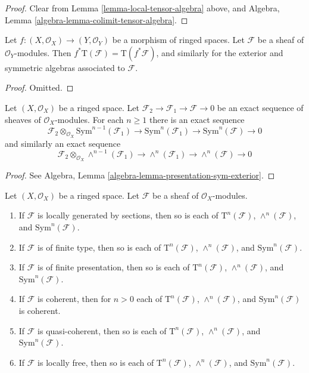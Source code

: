 \begin{proof}
Clear from Lemma \ref{lemma-local-tensor-algebra} above, and
Algebra, Lemma \ref{algebra-lemma-colimit-tensor-algebra}.
\end{proof}

\begin{lemma}
\label{lemma-pullback-tensor-algebra}
Let $f : (X, \mathcal{O}_X) \to (Y, \mathcal{O}_Y)$ be a morphism of
ringed spaces. Let $\mathcal{F}$ be a sheaf of $\mathcal{O}_Y$-modules.
Then $f^*\text{T}(\mathcal{F}) = \text{T}(f^*\mathcal{F})$,
and similarly for the exterior and symmetric algebras associated
to $\mathcal{F}$.
\end{lemma}

\begin{proof}
Omitted.
\end{proof}

\begin{lemma}
\label{lemma-presentation-sym-exterior}
Let $(X, \mathcal{O}_X)$ be a ringed space.
Let $\mathcal{F}_2 \to \mathcal{F}_1 \to \mathcal{F} \to 0$
be an exact sequence of sheaves of $\mathcal{O}_X$-modules.
For each $n \geq 1$ there is an exact sequence
$$
\mathcal{F}_2 \otimes_{\mathcal{O}_X} \text{Sym}^{n - 1}(\mathcal{F}_1)
\to
\text{Sym}^n(\mathcal{F}_1)
\to
\text{Sym}^n(\mathcal{F})
\to
0
$$
and similarly an exact sequence
$$
\mathcal{F}_2 \otimes_{\mathcal{O}_X} \wedge^{n - 1}(\mathcal{F}_1)
\to
\wedge^n(\mathcal{F}_1)
\to
\wedge^n(\mathcal{F})
\to
0
$$
\end{lemma}

\begin{proof}
See Algebra, Lemma \ref{algebra-lemma-presentation-sym-exterior}.
\end{proof}

\begin{lemma}
\label{lemma-tensor-algebra-permanence}
Let $(X, \mathcal{O}_X)$ be a ringed space.
Let $\mathcal{F}$ be a sheaf of $\mathcal{O}_X$-modules.
\begin{enumerate}
\item If $\mathcal{F}$ is locally generated by sections,
then so is each of $\text{T}^n(\mathcal{F})$,
$\wedge^n(\mathcal{F})$, and $\text{Sym}^n(\mathcal{F})$.
\item If $\mathcal{F}$ is of finite type,
then so is each of $\text{T}^n(\mathcal{F})$,
$\wedge^n(\mathcal{F})$, and $\text{Sym}^n(\mathcal{F})$.
\item If $\mathcal{F}$ is of finite presentation,
then so is each of $\text{T}^n(\mathcal{F})$,
$\wedge^n(\mathcal{F})$, and $\text{Sym}^n(\mathcal{F})$.
\item If $\mathcal{F}$ is coherent,
then for $n > 0$ each of $\text{T}^n(\mathcal{F})$,
$\wedge^n(\mathcal{F})$, and $\text{Sym}^n(\mathcal{F})$
is coherent.
\item If $\mathcal{F}$ is quasi-coherent,
then so is each of $\text{T}^n(\mathcal{F})$,
$\wedge^n(\mathcal{F})$, and $\text{Sym}^n(\mathcal{F})$.
\item If $\mathcal{F}$ is locally free,
then so is each of $\text{T}^n(\mathcal{F})$,
$\wedge^n(\mathcal{F})$, and $\text{Sym}^n(\mathcal{F})$.
\end{enumerate}
\end{lemma}

